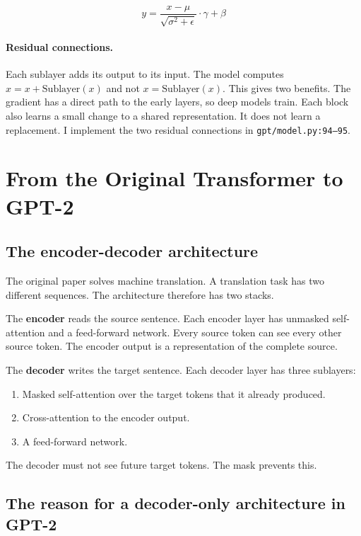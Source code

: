 \documentclass[11pt,a4paper]{article}
\newcommand{\code}[1]{\texttt{#1}}
\begin{document}
\begin{equation}
y = \frac{x - \mu}{\sqrt{\sigma^{2} + \epsilon}} \cdot \gamma + \beta
\label{eq:ln}
\end{equation}

\paragraph{Residual connections.} Each sublayer adds its output to its input. The model computes
$x = x + \mathrm{Sublayer}(x)$ and not $x = \mathrm{Sublayer}(x)$. This gives two benefits. The
gradient has a direct path to the early layers, so deep models train. Each block also learns a
small change to a shared representation. It does not learn a replacement. I implement the two
residual connections in \code{gpt/model.py:94--95}.

\section{From the Original Transformer to GPT-2}

\subsection{The encoder-decoder architecture}

The original paper solves machine translation. A translation task has two different sequences.
The architecture therefore has two stacks.

The \textbf{encoder} reads the source sentence. Each encoder layer has unmasked self-attention
and a feed-forward network. Every source token can see every other source token. The encoder
output is a representation of the complete source.

The \textbf{decoder} writes the target sentence. Each decoder layer has three sublayers:

\begin{enumerate}[nosep,leftmargin=1.6em]
  \item Masked self-attention over the target tokens that it already produced.
  \item Cross-attention to the encoder output.
  \item A feed-forward network.
\end{enumerate}

The decoder must not see future target tokens. The mask prevents this.

\subsection{The reason for a decoder-only architecture in GPT-2}
\end{document}
